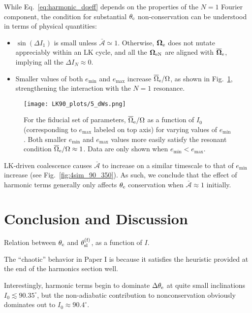 \documentclass[
        twocolumn,
        twocolappendix
    ]{aastex63}
\renewcommand*{\bm}[1]{\boldsymbol{\mathbf{#1}}}
\newcommand*{\p}[1]{\left(#1\right)}
\begin{document}
While Eq.~\eqref{eq:harmonic_dqeff} depends on the properties of the $N = 1$
Fourier component, the condition for substantial $\theta_{\rm e}$
non-conservation can be understood in terms of physical quantities:
\begin{itemize}
    \item $\sin \p{\Delta I_1}$ is small unless $\bar{\mathcal{A}} \simeq
        1$. Otherwise, $\bm{\Omega}_{\rm e}$ does not nutate appreciably within
        an LK cycle, and all the $\bm{\Omega}_{\rm eN}$ are aligned with
        $\overline{\bm{\Omega}}_{\rm e}$, implying all the $\Delta I_N \approx
        0$.

    \item Smaller values of both $e_{\min}$ and $e_{\max}$ increase
        $\overline{\Omega}_{\rm e} / \Omega$, as shown in Fig.~\ref{fig:dWs},
        strengthening the interaction with the $N = 1$ resonance.
\end{itemize}
\begin{figure}
    \centering
    \texttt{[image: LK90\_plots/5\_dWs.png]}
    \caption{For the fiducial set of parameters, $\overline{\Omega}_{\rm e} /
    \Omega$ as a function of $I_0$ (corresponding to $e_{\max}$ labeled on top
    axis) for varying values of $e_{\min}$. Both smaller $e_{\min}$ and
    $e_{\max}$ values more easily satisfy the resonant condition
    $\overline{\Omega}_{\rm e} / \Omega \approx 1$. Data are only shown when
    $e_{\min} < e_{\max}$.}\label{fig:dWs}
\end{figure}

LK-driven coalescence causes $\bar{\mathcal{A}}$ to increase on a similar
timescale to that of $e_{\min}$ increase (see Fig.~\ref{fig:4sim_90_350}). As
such, we conclude that the effect of harmonic terms generally only affects
$\theta_{\rm e}$ conservation when $\bar{\mathcal{A}} \approx 1$ initially.

\section{Conclusion and Discussion}\label{s:discussion}

Relation between $\theta_{\rm e}$ and $\theta_{\rm sl}^{\rm (f)}$, as a function
of $I$.

The ``chaotic'' behavior in Paper I is because it satisfies the heuristic
provided at the end of the harmonics section well.

Interestingly, harmonic terms begin to dominate $\Delta \theta_{\rm e}$ at quite
small inclinations $I_0 \lesssim 90.35^\circ$, but the non-adiabatic
contribution to nonconservation obviously dominates out to $I_0 \approx
90.4^\circ$.



\end{document}
